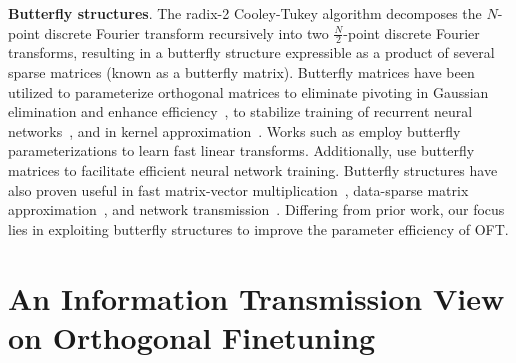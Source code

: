 \textbf{Butterfly structures}. The radix-2 Cooley-Tukey algorithm decomposes the $N$-point discrete Fourier transform recursively into two $\frac{N}{2}$-point discrete Fourier transforms, resulting in a butterfly structure expressible as a product of several sparse matrices (known as a butterfly matrix). Butterfly matrices have been utilized to parameterize orthogonal matrices to eliminate pivoting in Gaussian elimination and enhance efficiency~\cite{parker1995random}, to stabilize training of recurrent neural networks~\cite{jing2017tunable}, and in kernel approximation~\cite{munkhoeva2018quadrature}. Works such as \cite{dao2019learning,dao2019kaleidoscope} employ butterfly parameterizations to learn fast linear transforms. Additionally, \cite{chen2022pixelated,dao2022monarch} use butterfly matrices to facilitate efficient neural network training. Butterfly structures have also proven useful in fast matrix-vector multiplication~\cite{michielssen1996multilevel,o2010algorithm}, data-sparse matrix approximation~\cite{li2015butterfly}, and network transmission~\cite{klasing1994broadcasting,li2003linear,rajasingh2016transmission}. Differing from prior work, our focus lies in exploiting butterfly structures to improve the parameter efficiency of OFT.

\section{An Information Transmission View on Orthogonal Finetuning}

